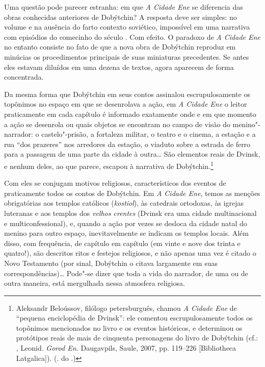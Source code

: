 Uma questão pode parecer estranha: em que \emph{A Cidade Ene} se
diferencia das obras conhecidas anteriores de Dobýtchin? A resposta deve
ser simples: no volume e na ausência do farto contexto soviético,
impossível em uma narrativa com episódios do comecinho do século \scalebox{.8}{XX}. Com
efeito. O paradoxo de \emph{A Cidade Ene} no entanto consiste no fato de
que a nova obra de Dobýtchin reproduz em minúcias os procedimentos
principais de suas miniaturas precedentes. Se antes eles estavam
diluídos em uma dezena de textos, agora aparecem de forma concentrada.

Da mesma forma que Dobýtchin em seus contos assinalou escrupulosamente
os topônimos no espaço em que se desenrolava a ação, em \emph{A Cidade
Ene} o leitor praticamente em cada capítulo é informado exatamente onde
e em que momento a ação se desenrola ou quais objetos se encontram no
campo de visão do menino"-narrador: o castelo"-prisão, a fortaleza
militar, o teatro e o cinema, a estação e a rua ``dos prazeres'' nos
arredores da estação, o viaduto sobre a estrada de ferro para a passagem
de uma parte da cidade à outra\ldots{} São elementos reais de Dvinsk, e
nenhum deles, ao que parece, escapou à narrativa de Dobýtchin.\footnote{Aleksandr
  Beloússov, filólogo petersburguês, chamou \emph{A Cidade Ene} de
  ``pequena enciclopédia de Dvinsk'': ele comentou escrupulosamente
  todos os topônimos mencionados no livro e os eventos históricos, e
  determinou os protótipos reais de mais de cinquenta personagens do
  livro de Dobýtchin (cf.: \scalebox{.8}{DOBÝTCHIN}, Leonid. \emph{Gorod En.}
  Daugavpils, Saule, 2007, pp. 119--226 [Bibliotheca Latgalica]). (\scalebox{.8}{N}. do
  \scalebox{.8}{A}.)}

Com eles se conjugam motivos religiosos, característicos dos eventos de
praticamente todos os contos de Dobýtchin. Em \emph{A Cidade Ene}, temos
as menções obrigatórias aos templos católicos (\emph{kostiol}), às
catedrais ortodoxas, às igrejas luteranas e aos templos dos \emph{velhos
crentes} (Dvinsk era uma cidade multinacional e multiconfessional), e,
quando a ação por vezes se desloca da cidade natal do menino para outro
espaço, inevitavelmente se indicam os templos locais. Além disso, com
frequência, de capítulo em capítulo (em vinte e nove dos trinta e
quatro!), são descritos ritos e festejos religiosos, e não apenas uma
vez é citado o Novo Testamento (por sinal, Dobýtchin o citava largamente
em suas correspondências)\ldots{} Pode"-se dizer que toda a vida do narrador,
de uma ou de outra maneira, está mergulhada nessa atmosfera religiosa.

